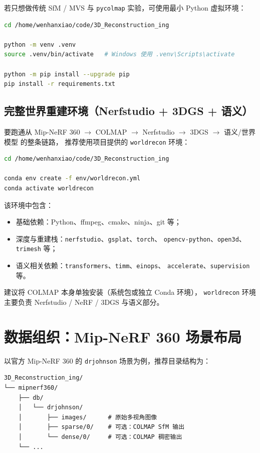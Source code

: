 \documentclass[12pt]{ctexart}
\begin{document}
若只想做传统 SfM / MVS 与 \texttt{pycolmap} 实验，可使用最小 Python 虚拟环境：
\begin{lstlisting}[language=bash]
cd /home/wenhanxiao/code/3D_Reconstruction_ing

python -m venv .venv
source .venv/bin/activate   # Windows 使用 .venv\Scripts\activate

python -m pip install --upgrade pip
pip install -r requirements.txt
\end{lstlisting}

\subsection{完整世界重建环境（Nerfstudio + 3DGS + 语义）}

要跑通从 Mip-NeRF 360 $\to$ COLMAP $\to$ Nerfstudio $\to$ 3DGS $\to$ 语义/世界模型 的整条链路，
推荐使用项目提供的 \texttt{worldrecon} 环境：
\begin{lstlisting}[language=bash]
cd /home/wenhanxiao/code/3D_Reconstruction_ing

conda env create -f env/worldrecon.yml
conda activate worldrecon
\end{lstlisting}

该环境中包含：
\begin{itemize}
  \item 基础依赖：Python、ffmpeg、cmake、ninja、git 等；
  \item 深度与重建栈：\texttt{nerfstudio}、\texttt{gsplat}、\texttt{torch}、
        \texttt{opencv-python}、\texttt{open3d}、\texttt{trimesh} 等；
  \item 语义相关依赖：\texttt{transformers}、\texttt{timm}、\texttt{einops}、
        \texttt{accelerate}、\texttt{supervision} 等。
\end{itemize}

建议将 COLMAP 本身单独安装（系统包或独立 Conda 环境），
\texttt{worldrecon} 环境主要负责 Nerfstudio / NeRF / 3DGS 与语义部分。

\section{数据组织：Mip-NeRF 360 场景布局}

以官方 Mip-NeRF 360 的 \texttt{drjohnson} 场景为例，推荐目录结构为：
\begin{lstlisting}
3D_Reconstruction_ing/
└── mipnerf360/
    ├── db/
    │   └── drjohnson/
    │       ├── images/      # 原始多视角图像
    │       ├── sparse/0/    # 可选：COLMAP SfM 输出
    │       └── dense/0/     # 可选：COLMAP 稠密输出
    └── ...
\end{lstlisting}
\end{document}
